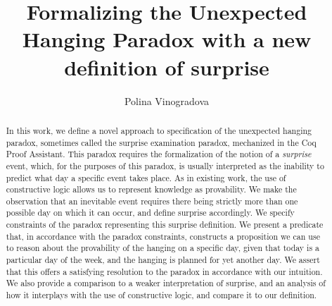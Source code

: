 \documentclass[runningheads]{llncs}
\begin{document}
%
\title{Formalizing the Unexpected Hanging Paradox with a new definition of surprise} %
%
%
\author{Polina Vinogradova }
%
%
%
\maketitle              %
%
\begin{abstract}

  In this work, we define a novel approach to specification of the
  unexpected hanging paradox, sometimes called the surprise examination paradox,
  mechanized in the Coq Proof Assistant.
  This paradox requires the formalization of the notion of
  a \emph{surprise} event, which, for the purposes of this paradox, is usually interpreted as
  the inability to predict what day a specific event takes place. As in existing work,
  the use of constructive logic allows us to represent knowledge as provability.
  We make the observation that an inevitable event requires there being strictly
  more than one possible day on which it can occur, and define surprise accordingly. We
  specify constraints of the paradox representing this surprise definition.
  We present a predicate that, in accordance with the paradox constraints, constructs a
  proposition we can use to reason about
  the provability of the hanging on a specific day, given that today is a particular day of the week, and the hanging
  is planned for yet another day.
  We assert that this offers a satisfying resolution to the paradox in accordance with
  our intuition.
  We also provide a comparison to a weaker interpretation of surprise,
  and an analysis of how it interplays with the use of constructive logic, and
  compare it to our definition.

\end{abstract}
%
\end{document}
